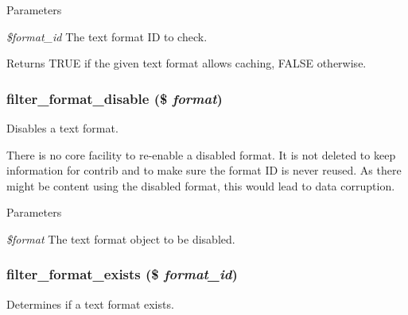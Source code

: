 \begin{DoxyParams}{Parameters}
\item[{\em \$format\_\-id}]The text format ID to check.\end{DoxyParams}
\begin{DoxyReturn}{Returns}
TRUE if the given text format allows caching, FALSE otherwise. 
\end{DoxyReturn}
\hypertarget{filter_8module_a2d4a8c1b750647973b3130d077a598ca}{
\subsubsection[{filter\_\-format\_\-disable}]{\setlength{\rightskip}{0pt plus 5cm}filter\_\-format\_\-disable (\$ {\em format})}}
\label{filter_8module_a2d4a8c1b750647973b3130d077a598ca}
Disables a text format.

There is no core facility to re-\/enable a disabled format. It is not deleted to keep information for contrib and to make sure the format ID is never reused. As there might be content using the disabled format, this would lead to data corruption.


\begin{DoxyParams}{Parameters}
\item[{\em \$format}]The text format object to be disabled. \end{DoxyParams}
\hypertarget{filter_8module_a2145846ce416161a821a055c9169a3a1}{
\subsubsection[{filter\_\-format\_\-exists}]{\setlength{\rightskip}{0pt plus 5cm}filter\_\-format\_\-exists (\$ {\em format\_\-id})}}
\label{filter_8module_a2145846ce416161a821a055c9169a3a1}
Determines if a text format exists.


